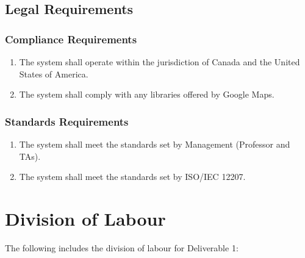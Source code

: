 \documentclass[titlepage]{article}
\newcounter{req}
\begin{document}
		\subsection{Legal Requirements}
		\setcounter{req}{0}
		\label{sub:legal_requirements}
		
		\subsubsection{Compliance Requirements}
		\label{ssub:compliance_requirements}
		\begin{enumerate}[{LR}1. ]
		\setcounter{enumi}{\value{req}}
			\item
			The system shall operate within the jurisdiction of Canada and the United States of America.
			\item
			The system shall comply with any libraries offered by Google Maps.
		\setcounter{req}{\theenumi}
		\end{enumerate}
		
		\subsubsection{Standards Requirements}
		\label{ssub:standards_requirements}
		\begin{enumerate}[{LR}1. ]
		\setcounter{enumi}{\value{req}}
			\item
			The system shall meet the standards set by Management (Professor and TAs).
			\item
			The system shall meet the standards set by ISO/IEC 12207.
		\setcounter{req}{\theenumi}
		\end{enumerate}
		
		
		
		\clearpage{}
		\appendix
		\section{Division of Labour}
		\label{sec:division_of_labour}
		The following includes the division of labour for Deliverable 1:
		
\end{document}
